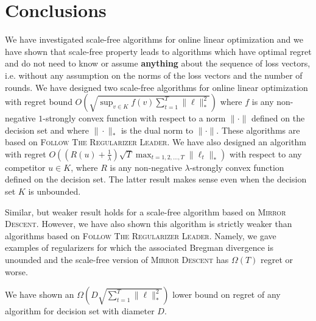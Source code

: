 \section{Conclusions}
\label{section:conclusions}

We have investigated scale-free algorithms for online linear optimization and
we have shown that scale-free property leads to algorithms which have optimal
regret and do not need to know or assume \textbf{anything} about the sequence
of loss vectors, i.e. without any assumption on the norms of the loss vectors
and the number of rounds. We have designed two scale-free algorithms for online linear
optimization with regret bound $O \left(\sqrt{\sup_{v \in K} f(v) \sum_{t=1}^T
\|\ell\|_*^2} \right)$ where $f$ is any non-negative $1$-strongly convex
function with respect to a norm $\|\cdot\|$ defined on the decision set and
where $\|\cdot\|_*$ is the dual norm to $\|\cdot\|$.  These algorithms are
based on \textsc{Follow The Regularizer Leader}.  We have also designed an
algorithm with regret $O\left((R(u) + \frac{1}{\lambda}) \sqrt{T}
\max_{t=1,2,\dots,T} \|\ell_t\|_* \right)$ with respect to any competitor $u
\in K$, where $R$ is any non-negative $\lambda$-strongly convex function
defined on the decision set.  The latter result makes sense even when the
decision set $K$ is unbounded.

Similar, but weaker result holds for a scale-free algorithm based on
\textsc{Mirror Descent}. However, we have also shown this algorithm is strictly
weaker than algorithms based on \textsc{Follow The Regularizer Leader}. Namely,
we gave examples of regularizers for which the associated Bregman divergence is
unounded and the scale-free version of \textsc{Mirror Descent} has $\Omega(T)$
regret or worse.

We have shown an $\Omega\left( D \sqrt{\sum_{t=1}^T \|\ell\|_*^2}\right)$
lower bound on regret of any algorithm for decision set with diameter $D$.
